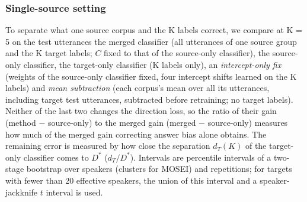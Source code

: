 \subsubsection{Single-source setting}\label{sec:rq1a-single}
To separate what one source corpus and the K labels correct, we compare at K = 5 on the test utterances the merged classifier (all utterances of one source group and the K target labels; $C$ fixed to that of the source-only classifier), the source-only classifier, the target-only classifier (K labels only), an \emph{intercept-only fix} (weights of the source-only classifier fixed, four intercept shifts learned on the K labels) and \emph{mean subtraction} (each corpus's mean over all its utterances, including target test utterances, subtracted before retraining; no target labels). Neither of the last two changes the direction loss, so the ratio of their gain (method $-$ source-only) to the merged gain (merged $-$ source-only) measures how much of the merged gain correcting answer bias alone obtains. The remaining error is measured by how close the separation $d_T(K)$ of the target-only classifier comes to $D^{*}$ ($d_T/D^{*}$). Intervals are percentile intervals of a two-stage bootstrap over speakers (clusters for MOSEI) and repetitions; for targets with fewer than 20 effective speakers, the union of this interval and a speaker-jackknife $t$ interval is used.

